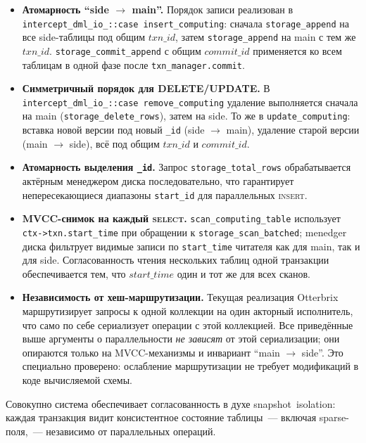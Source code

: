 \begin{itemize}
    \item \textbf{Атомарность ``side $\to$ main''.} Порядок записи
    реализован в \texttt{intercept\_dml\_io\_::case
    insert\_computing}: сначала
    \texttt{storage\_append} на все side-таблицы под общим
    $\mathit{txn\_id}$, затем \texttt{storage\_append} на main с
    тем же $\mathit{txn\_id}$. \texttt{storage\_commit\_append}
    с общим $\mathit{commit\_id}$ применяется ко всем таблицам в
    одной фазе после \texttt{txn\_manager.commit}.
    \item \textbf{Симметричный порядок для DELETE/UPDATE.} В
    \texttt{intercept\_dml\_io\_::case remove\_computing} удаление
    выполняется сначала на main (\texttt{storage\_delete\_rows}),
    затем на side. То же в \texttt{update\_computing}: вставка
    новой версии под новый \texttt{\_id} (side $\to$ main),
    удаление старой версии (main $\to$ side), всё под общим
    $\mathit{txn\_id}$ и $\mathit{commit\_id}$.
    \item \textbf{Атомарность выделения \texttt{\_id}.} Запрос
    \texttt{storage\_total\_rows} обрабатывается актёрным
    менеджером диска последовательно, что гарантирует
    непересекающиеся диапазоны \texttt{start\_id} для параллельных
    \textsc{insert}.
    \item \textbf{MVCC-снимок на каждый \textsc{select}.}
    \texttt{scan\_computing\_table} использует
    \texttt{ctx->txn.start\_time} при обращении к
    \texttt{storage\_scan\_batched}; menedger диска фильтрует
    видимые записи по \texttt{start\_time} читателя как для main,
    так и для side. Согласованность чтения нескольких таблиц одной
    транзакции обеспечивается тем, что
    $\mathit{start\_time}$ один и тот же для всех сканов.
    \item \textbf{Независимость от хеш-маршрутизации.} Текущая
    реализация Otterbrix маршрутизирует запросы к одной коллекции
    на один акторный исполнитель, что само по себе сериализует
    операции с этой коллекцией. Все приведённые выше аргументы о
    параллельности \emph{не зависят} от этой сериализации; они
    опираются только на MVCC-механизмы и инвариант ``main $\to$
    side''. Это специально проверено: ослабление маршрутизации не
    требует модификаций в коде вычисляемой схемы.
\end{itemize}

Совокупно система обеспечивает согласованность в духе
snapshot~isolation: каждая транзакция видит консистентное состояние
таблицы~--- включая sparse-поля,~--- независимо от параллельных
операций.

